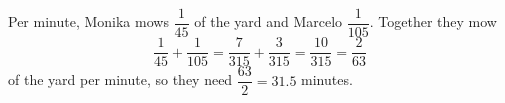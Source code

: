 Per minute, Monika mows $\dfrac1{45}$ of the yard and Marcelo $\dfrac1{105}$. Together they mow
\[\dfrac1{45}+\dfrac1{105}=\dfrac{7}{315}+\dfrac{3}{315}=\dfrac{10}{315}=\dfrac{2}{63}\]
of the yard per minute, so they need $\dfrac{63}{2}=\boxed{31.5}$ minutes.
